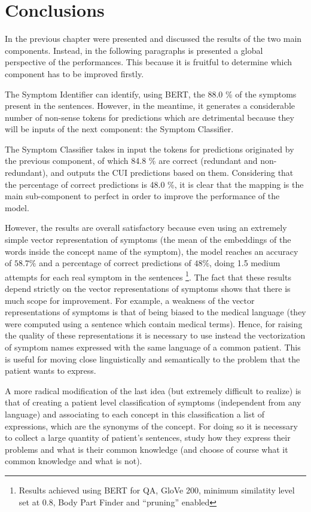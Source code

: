 \chapter{Conclusions}
\label{cha:conclusions}

In the previous chapter were presented and discussed the results of the two main components. Instead, in the following paragraphs is presented a global perspective of the performances. This because it is fruitful to determine which component has to be improved firstly.

The Symptom Identifier can identify, using BERT, the 88.0 \% of the symptoms present in the sentences. However, in the meantime, it generates a considerable number of non-sense tokens for predictions which are detrimental because they will be inputs of the next component: the Symptom Classifier.

The Symptom Classifier takes in input the tokens for predictions originated by the previous component, of which 84.8 \% are correct (redundant and non-redundant), and outputs the CUI predictions based on them. Considering that the percentage of correct predictions is 48.0 \%, it is clear that the mapping is the main sub-component to perfect in order to improve the performance of the model.

However, the results are overall satisfactory because even using an extremely simple vector representation of symptoms (the mean of the embeddings of the words inside the concept name of the symptom), the model reaches an accuracy of $58.7 \%$ and a percentage of correct predictions of $48 \%$, doing 1.5 medium attempts for each real symptom in the sentences \footnote{Results achieved using BERT for QA, GloVe 200, minimum similatity level set at 0.8, Body Part Finder and ``pruning'' enabled}. The fact that these results depend strictly on the vector representations of symptoms shows that there is much scope for improvement. For example, a weakness of the vector representations of symptoms is that of being biased to the medical language (they were computed using a sentence which contain medical terms). Hence, for raising the quality of these representations it is necessary to use instead the vectorization of symptom names expressed with the same language of a common patient. This is useful for moving close linguistically and semantically to the problem that the patient wants to express.

A more radical modification of the last idea (but extremely difficult to realize) is that of creating a patient level classification of symptoms (independent from any language) and associating to each concept in this classification a list of expressions, which are the synonyms of the concept. For doing so it is necessary to collect a large quantity of patient's sentences, study how they express their problems and what is their common knowledge (and choose of course what it common knowledge and what is not).

